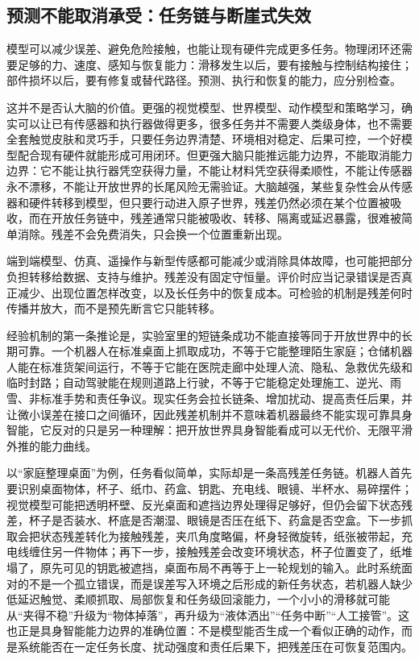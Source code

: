 \subsection{预测不能取消承受：任务链与断崖式失效}


模型可以减少误差、避免危险接触，也能让现有硬件完成更多任务。物理闭环还需要足够的力、速度、感知与恢复能力：滑移发生以后，要有接触与控制结构接住；部件损坏以后，要有修复或替代路径。预测、执行和恢复的能力，应分别检查。

这并不是否认大脑的价值。更强的视觉模型、世界模型、动作模型和策略学习，确实可以让已有传感器和执行器做得更多，很多任务并不需要人类级身体，也不需要全套触觉皮肤和灵巧手，只要任务边界清楚、环境相对稳定、后果可控，一个好模型配合现有硬件就能形成可用闭环。但更强大脑只能推远能力边界，不能取消能力边界：它不能让执行器凭空获得力量，不能让材料凭空获得柔顺性，不能让传感器永不漂移，不能让开放世界的长尾风险无需验证。大脑越强，某些复杂性会从传感器和硬件转移到模型，但只要行动进入原子世界，残差仍然必须在某个位置被吸收，而在开放任务链中，残差通常只能被吸收、转移、隔离或延迟暴露，很难被简单消除。残差不会免费消失，只会换一个位置重新出现。

端到端模型、仿真、遥操作与新型传感都可能减少或消除具体故障，也可能把部分负担转移给数据、支持与维护。残差没有固定守恒量。评价时应当记录错误是否真正减少、出现位置怎样改变，以及长任务中的恢复成本。可检验的机制是残差何时传播并放大，而不是预先断言它只能转移。


经验机制的第一条推论是，实验室里的短链条成功不能直接等同于开放世界中的长期可靠。一个机器人在标准桌面上抓取成功，不等于它能整理陌生家庭；仓储机器人能在标准货架间运行，不等于它能在医院走廊中处理人流、隐私、急救优先级和临时封路；自动驾驶能在规则道路上行驶，不等于它能稳定处理施工、逆光、雨雪、非标准手势和责任争议。现实任务会拉长链条、增加扰动、提高责任后果，并让微小误差在接口之间循环，因此残差机制并不意味着机器最终不能实现可靠具身智能，它反对的只是另一种理解：把开放世界具身智能看成可以无代价、无限平滑外推的能力曲线。

以“家庭整理桌面”为例，任务看似简单，实际却是一条高残差任务链。机器人首先要识别桌面物体，杯子、纸巾、药盒、钥匙、充电线、眼镜、半杯水、易碎摆件；视觉模型可能把透明杯壁、反光桌面和遮挡边界处理得足够好，但仍会留下状态残差，杯子是否装水、杯底是否潮湿、眼镜是否压在纸下、药盒是否空盒。下一步抓取会把状态残差转化为接触残差，夹爪角度略偏，杯身轻微旋转，纸张被带起，充电线缠住另一件物体；再下一步，接触残差会改变环境状态，杯子位置变了，纸堆塌了，原先可见的钥匙被遮挡，桌面布局不再等于上一轮规划的输入。此时系统面对的不是一个孤立错误，而是误差写入环境之后形成的新任务状态，若机器人缺少低延迟触觉、柔顺抓取、局部恢复和任务级回滚能力，一个小小的滑移就可能从“夹得不稳”升级为“物体掉落”，再升级为“液体洒出”“任务中断”“人工接管”。这也正是具身智能能力边界的准确位置：不是模型能否生成一个看似正确的动作，而是系统能否在一定任务长度、扰动强度和责任后果下，把残差压在可恢复范围内。

